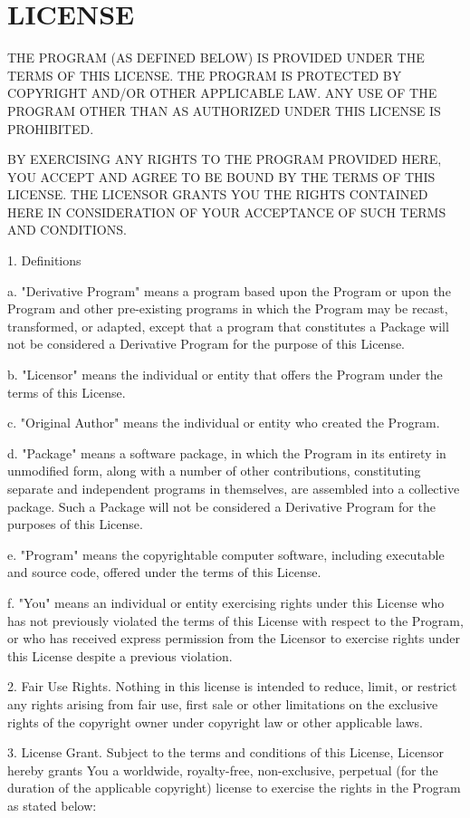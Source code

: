 \section*{LICENSE}

THE PROGRAM (AS DEFINED BELOW) IS PROVIDED UNDER THE TERMS OF THIS LICENSE. THE
PROGRAM IS PROTECTED BY COPYRIGHT AND/OR OTHER APPLICABLE LAW. ANY USE OF THE
PROGRAM OTHER THAN AS AUTHORIZED UNDER THIS LICENSE IS PROHIBITED.

BY EXERCISING ANY RIGHTS TO THE PROGRAM PROVIDED HERE, YOU ACCEPT AND AGREE TO
BE BOUND BY THE TERMS OF THIS LICENSE. THE LICENSOR GRANTS YOU THE RIGHTS
CONTAINED HERE IN CONSIDERATION OF YOUR ACCEPTANCE OF SUCH TERMS AND CONDITIONS.

1. Definitions

a. "Derivative Program" means a program based upon the Program or upon the
Program and other pre-existing programs in which the Program may be recast,
transformed, or adapted, except that a program that constitutes a Package will
not be considered a Derivative Program for the purpose of this License.

b. "Licensor" means the individual or entity that offers the Program under the
terms of this License.

c. "Original Author" means the individual or entity who created the Program.

d. "Package" means a software package, in which the Program in its entirety in
unmodified form, along with a number of other contributions, constituting
separate and independent programs in themselves, are assembled into a collective
package. Such a Package will not be considered a Derivative Program for the
purposes of this License.

e. "Program" means the copyrightable computer software, including executable and
source code, offered under the terms of this License.

f. "You" means an individual or entity exercising rights under this License who
has not previously violated the terms of this License with respect to the
Program, or who has received express permission from the Licensor to exercise
rights under this License despite a previous violation.

2. Fair Use Rights. Nothing in this license is intended to reduce, limit, or
restrict any rights arising from fair use, first sale or other limitations on
the exclusive rights of the copyright owner under copyright law or other
applicable laws.

3. License Grant. Subject to the terms and conditions of this License, Licensor
hereby grants You a worldwide, royalty-free, non-exclusive, perpetual (for the
duration of the applicable copyright) license to exercise the rights in the
Program as stated below:

